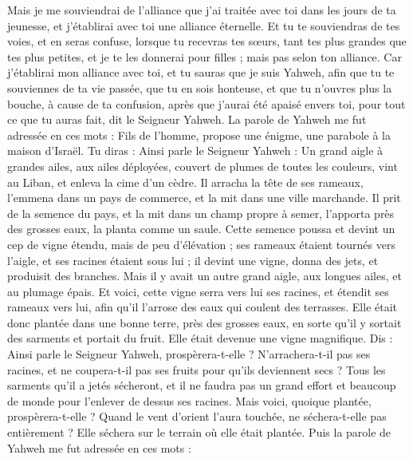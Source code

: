 \begin{multicols}{2}
Mais je me souviendrai de l'alliance que j'ai traitée avec toi dans les jours de ta jeunesse, et j'établirai avec toi une alliance éternelle.
Et tu te souviendras de tes voies, et en seras confuse, lorsque tu recevras tes sœurs, tant tes plus grandes que tes plus petites, et je te les donnerai pour filles ; mais pas selon ton alliance.
Car j'établirai mon alliance avec toi, et tu sauras que je suis Yahweh,
afin que tu te souviennes de ta vie passée, que tu en sois honteuse, et que tu n'ouvres plus la bouche, à cause de ta confusion, après que j'aurai été apaisé envers toi, pour tout ce que tu auras fait, dit le Seigneur Yahweh.
\VerseOne{}La parole de Yahweh me fut adressée en ces mots :
Fils de l'homme, propose une énigme, une parabole à la maison d'Israël.
Tu diras : Ainsi parle le Seigneur Yahweh : Un grand aigle à grandes ailes, aux ailes déployées, couvert de plumes de toutes les couleurs, vint au Liban, et enleva la cime d'un cèdre.
Il arracha la tête de ses rameaux, l'emmena dans un pays de commerce, et la mit dans une ville marchande.
Il prit de la semence du pays, et la mit dans un champ propre à semer, l'apporta près des grosses eaux, la planta comme un saule.
Cette semence poussa et devint un cep de vigne étendu, mais de peu d'élévation ; ses rameaux étaient tournés vers l'aigle, et ses racines étaient sous lui ; il devint une vigne, donna des jets, et produisit des branches.
Mais il y avait un autre grand aigle, aux longues ailes, et au plumage épais. Et voici, cette vigne serra vers lui ses racines, et étendit ses rameaux vers lui, afin qu'il l'arrose des eaux qui coulent des terrasses.
Elle était donc plantée dans une bonne terre, près des grosses eaux, en sorte qu'il y sortait des sarments et portait du fruit. Elle était devenue une vigne magnifique.
Dis : Ainsi parle le Seigneur Yahweh, prospèrera-t-elle ? N'arrachera-t-il pas ses racines, et ne coupera-t-il pas ses fruits pour qu'ils deviennent secs ? Tous les sarments qu'il a jetés sécheront, et il ne faudra pas un grand effort et beaucoup de monde pour l'enlever de dessus ses racines.
Mais voici, quoique plantée, prospèrera-t-elle ? Quand le vent d'orient l'aura touchée, ne séchera-t-elle pas entièrement ? Elle séchera sur le terrain où elle était plantée.
Puis la parole de Yahweh me fut adressée en ces mots :

\end{multicols}
